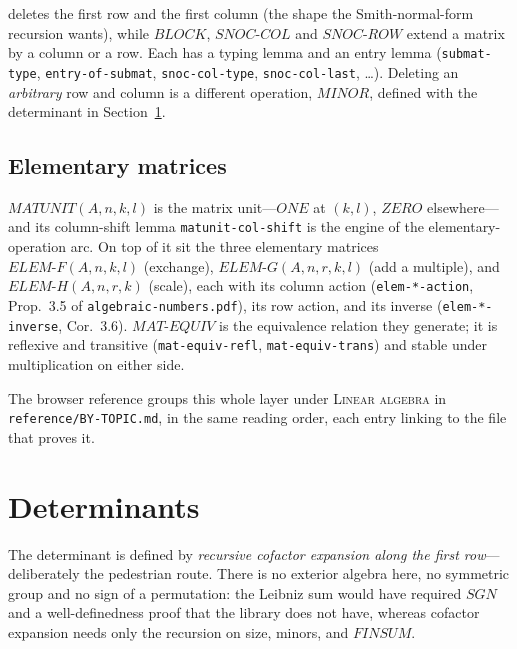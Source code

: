 \noindent
deletes the first row and the first column (the shape the Smith-normal-form
recursion wants), while $\mathit{BLOCK}$, $\mathit{SNOC\text{-}COL}$ and
$\mathit{SNOC\text{-}ROW}$ extend a matrix by a column or a row.  Each has a
typing lemma and an entry lemma (\texttt{submat-type},
\texttt{entry-of-submat}, \texttt{snoc-col-type}, \texttt{snoc-col-last},
\dots).  Deleting an \emph{arbitrary} row and column is a different
operation, $\mathit{MINOR}$, defined with the determinant in
Section~\ref{sec:determinant}.

\subsection{Elementary matrices}

$\mathit{MATUNIT}(A, n, k, l)$ is the matrix unit---$\mathit{ONE}$ at
$(k,l)$, $\mathit{ZERO}$ elsewhere---and its column-shift lemma
\texttt{matunit-col-shift} is the engine of the elementary-operation
arc.  On top of it sit the three elementary matrices
$\mathit{ELEM\text{-}F}(A,n,k,l)$ (exchange), $\mathit{ELEM\text{-}G}(A,n,r,k,l)$
(add a multiple), and $\mathit{ELEM\text{-}H}(A,n,r,k)$ (scale), each with
its column action (\texttt{elem-*-action}, Prop.~3.5 of
\texttt{algebraic-numbers.pdf}), its row action, and its inverse
(\texttt{elem-*-inverse}, Cor.~3.6).  $\mathit{MAT\text{-}EQUIV}$ is the
equivalence relation they generate; it is reflexive and transitive
(\texttt{mat-equiv-refl}, \texttt{mat-equiv-trans}) and stable under
multiplication on either side.

\begin{remark}
The browser reference groups this whole layer under \textsc{Linear
algebra} in \texttt{reference/BY-TOPIC.md}, in the same reading order,
each entry linking to the file that proves it.
\end{remark}

\section{Determinants}
\label{sec:determinant}

The determinant is defined by \emph{recursive cofactor expansion along
the first row}---deliberately the pedestrian route.  There is no
exterior algebra here, no symmetric group and no sign of a permutation:
the Leibniz sum would have required $\mathit{SGN}$ and a well-definedness
proof that the library does not have, whereas cofactor expansion needs
only the recursion on size, minors, and $\mathit{FINSUM}$.

